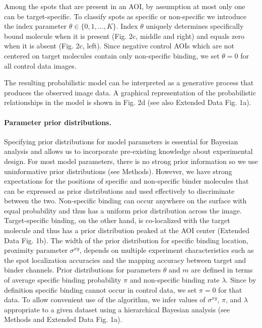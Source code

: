 Among the spots that are present in an AOI, by assumption at most only one can be target-specific. To classify spots as specific or non-specific we introduce the index parameter $\theta \in \{0,1,\dots,K\}$. Index $\theta$ uniquely determines specifically bound molecule when it is present (Fig. 2c, middle and right) and equals zero when it is absent (Fig. 2c, left). Since negative control AOIs which are not centered on target molecules contain only non-specific binding, we set $\theta = 0$ for all control data images. 

The resulting probabilistic model can be interpreted as a generative process that produces the observed image data. A graphical representation of the probabilistic relationships in the model is shown in Fig. 2d (see also Extended Data Fig. 1a).

\paragraph{Parameter prior distributions.}
Specifying prior distributions for model parameters is essential for Bayesian analysis and allows us to incorporate pre-existing knowledge about experimental design. For most model parameters, there is no strong prior information so we use uninformative prior distributions (see Methods). However, we have strong expectations for the positions of specific and non-specific binder molecules that can be expressed as prior distributions and used effectively to discriminate between the two. Non-specific binding can occur anywhere on the surface with equal probability and thus has a uniform prior distribution across the image. Target-specific binding, on the other hand, is co-localized with the target molecule and thus has a prior distribution peaked at the AOI center (Extended Data Fig. 1b). The width of the prior distribution for specific binding location, proximity parameter $\sigma^{xy}$, depends on multiple experiment characteristics such as the spot localization accuracies and the mapping accuracy between target and binder channels. Prior distributions for parameters $\theta$ and $m$ are defined in terms of average specific binding probability $\pi$ and non-specific binding rate $\lambda$. Since by definition specific binding cannot occur in control data, we set $\pi = 0$ for that data. To allow convenient use of the algorithm, we infer values of $\sigma^{xy}$, $\pi$, and $\lambda$ appropriate to a given dataset using a hierarchical Bayesian analysis (see Methods and Extended Data Fig. 1a). 

